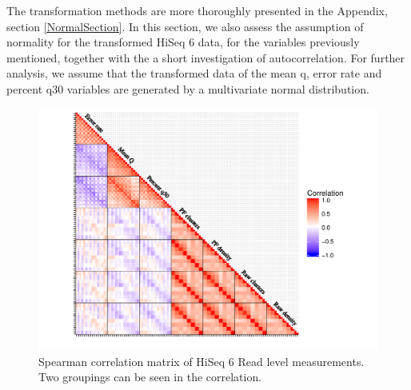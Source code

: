 \documentclass[a4paper,11pt,fleqn,twoside,notitlepage]{report}\usepackage[]{graphicx}\usepackage[]{color}
\makeatletter
\def\maxwidth{ %
  \ifdim\Gin@nat@width>\linewidth
    \linewidth
  \else
    \Gin@nat@width
  \fi
}
\newenvironment{knitrout}{}{} %
\makeatother
\begin{document}
The transformation methods are more thoroughly presented in the Appendix, section \ref{NormalSection}. In this section, we also assess the assumption of normality for the transformed HiSeq 6 data, for the variables previously mentioned, together with the a short investigation of autocorrelation. For further analysis, we assume that the transformed data of the mean q, error rate and percent q30 variables are generated by a multivariate normal distribution. 
\begin{knitrout}
\color{fgcolor}\begin{figure}[!ht]
\includegraphics[width=\maxwidth]{figure/ReadlvlCor-1} \caption[Spearman correlation matrix of HiSeq 6 Read level measurements]{Spearman correlation matrix of HiSeq 6 Read level measurements. Two groupings can be seen in the correlation.}\label{fig:ReadlvlCor}
\end{figure}


\end{knitrout}
\end{document}
